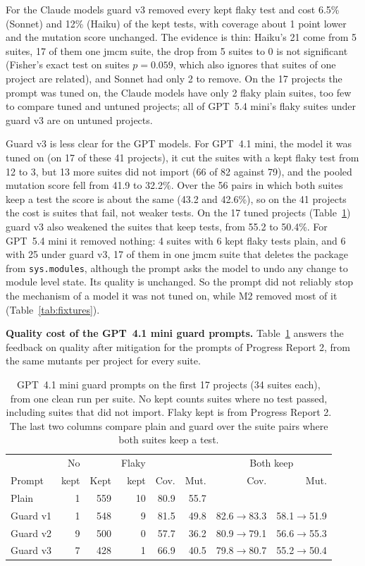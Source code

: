 For the Claude models guard v3 removed every kept flaky test and cost 6.5\% (Sonnet) and 12\% (Haiku) of the kept tests, with coverage about 1 point lower and the mutation score unchanged. The evidence is thin: Haiku's 21 come from 5 suites, 17 of them one jmcm suite, the drop from 5 suites to 0 is not significant (Fisher's exact test on suites $p = 0.059$, which also ignores that suites of one project are related), and Sonnet had only 2 to remove. On the 17 projects the prompt was tuned on, the Claude models have only 2 flaky plain suites, too few to compare tuned and untuned projects; all of GPT~5.4 mini's flaky suites under guard v3 are on untuned projects.

Guard v3 is less clear for the GPT models. For GPT~4.1 mini, the model it was tuned on (on 17 of these 41 projects), it cut the suites with a kept flaky test from 12 to 3, but 13 more suites did not import (66 of 82 against 79), and the pooled mutation score fell from 41.9 to 32.2\%. Over the 56 pairs in which both suites keep a test the score is about the same (43.2 and 42.6\%), so on the 41 projects the cost is suites that fail, not weaker tests. On the 17 tuned projects (Table~\ref{tab:quality}) guard v3 also weakened the suites that keep tests, from 55.2 to 50.4\%. For GPT~5.4 mini it removed nothing: 4 suites with 6 kept flaky tests plain, and 6 with 25 under guard v3, 17 of them in one jmcm suite that deletes the package from \texttt{sys.modules}, although the prompt asks the model to undo any change to module level state. Its quality is unchanged. So the prompt did not reliably stop the mechanism of a model it was not tuned on, while M2 removed most of it (Table~\ref{tab:fixtures}).

\textbf{Quality cost of the GPT~4.1 mini guard prompts.} Table~\ref{tab:quality} answers the feedback on quality after mitigation for the prompts of Progress Report 2, from the same mutants per project for every suite.

\begin{table}[htbp]
\caption{GPT~4.1 mini guard prompts on the first 17 projects (34 suites each), from one clean run per suite. No kept counts suites where no test passed, including suites that did not import. Flaky kept is from Progress Report 2. The last two columns compare plain and guard over the suite pairs where both suites keep a test.}
\label{tab:quality}
\small
\setlength{\tabcolsep}{2pt}
\begin{tabularx}{\columnwidth}{Xrrrrrrr}
\toprule
 & No & & Flaky & & & \multicolumn{2}{c}{Both keep} \\
Prompt & kept & Kept & kept & Cov. & Mut. & Cov. & Mut. \\
\midrule
Plain & 1 & 559 & 10 & 80.9 & 55.7 & & \\
Guard v1 & 1 & 548 & 9 & 81.5 & 49.8 & 82.6$\to$83.3 & 58.1$\to$51.9 \\
Guard v2 & 9 & 500 & 0 & 57.7 & 36.2 & 80.9$\to$79.1 & 56.6$\to$55.3 \\
Guard v3 & 7 & 428 & 1 & 66.9 & 40.5 & 79.8$\to$80.7 & 55.2$\to$50.4 \\
\bottomrule
\end{tabularx}
\end{table}

